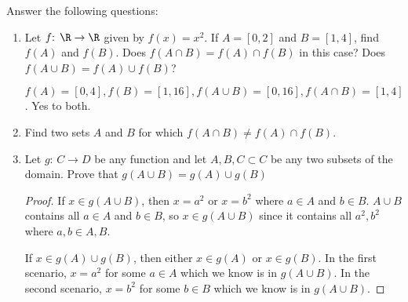 Answer the following questions:
\begin{enumerate}[label = \alph*.]
	\item Let $f \text{: } \R \to \R$ given by $f\left( x \right) = x^{2}$. If $A = [0, 2]$ and  $B = [1, 4]$, find $f\left( A \right) $ and $f\left( B \right) $. Does $f\left( A \cap B \right) = f\left( A \right) \cap f\left( B \right) $ in this case? Does $f\left( A \cup B \right) = f\left( A \right) \cup f\left( B \right) $?

		$f\left( A \right) = [0, 4], f\left( B \right) = [1, 16], f\left( A \cup B \right) = [0, 16], f\left( A \cap B\right) = [1, 4] $. Yes to both.
	\item Find two sets $A$ and $B$ for which $f\left( A \cap B \right) \neq f\left( A \right) \cap f\left( B \right) $.
	\item Let $g \text{: } C \to D$ be any function and let $A, B, C \subset C$ be any two subsets of the domain. Prove that $g\left( A \cup B \right) = g\left( A \right) \cup g\left( B \right) $
	\begin{proof}
	If $x \in g\left( A \cup B \right) $, then $x = a^{2}$ or $x = b^{2}$ where $a \in A$ and $b \in B$. $A \cup B$ contains all  $a \in A$ and $b \in B$, so $x \in g\left( A \cup B \right) $ since it contains all $a^{2}, b^{2}$ where $a, b \in A, B$.

		If $x \in g\left( A \right) \cup g\left( B \right) $, then either $x \in g\left( A \right) $ or $x \in g\left( B \right) $. In the first scenario, $x = a^{2}$  for some $a \in A$ which we know is in $g\left( A \cup B \right) $. In the second scenario, $x = b^{2}$ for some $b \in B$ which we know is in $g\left( A \cup B \right) $.
	\end{proof}
   	
\end{enumerate}







